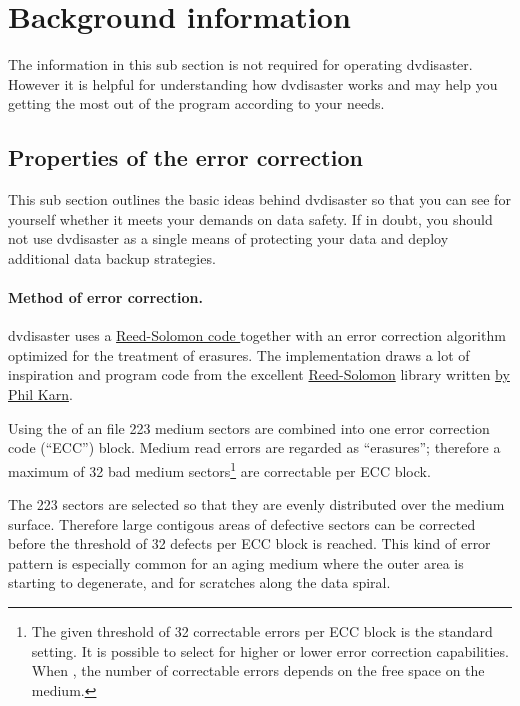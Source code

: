 \section{Background information}
\label{background}

The information in this sub section is not required for operating 
dvdisaster. However it is helpful for understanding how dvdisaster works 
and may help you getting the most out of the program according to your needs. 

\subsection{Properties of the error correction}
\label{background-properties}

This sub section outlines the basic ideas behind dvdisaster so that you can 
see for yourself whether it meets your demands on data safety. If in doubt, 
you should not use dvdisaster as a single means of protecting your data
and deploy additional data backup strategies.

\paragraph{Method of error correction.}   dvdisaster 
uses a \href{http://en.wikipedia.org/wiki/Reed-Solomon_error_correction}{Reed-Solomon code } together 
with an error correction algorithm optimized for the treatment of erasures. The 
implementation draws a lot of inspiration and program code from the 
excellent \href{http://www.ka9q.net/code/fec/}{Reed-Solomon} library written 
\href{http://www.ka9q.net/}{by Phil Karn}.

Using the  of 
an  file 223 medium sectors 
are combined into one error correction code (``ECC'') block. 
Medium read errors are regarded as ``erasures''; therefore a maximum 
of 32 bad medium sectors\footnote{The given threshold of 32 correctable errors per ECC 
block is the standard setting. It is possible to select  
for higher or lower error correction capabilities. 
When , 
the number of correctable errors depends on the free space on the medium.} are 
correctable per ECC block.

The 223 sectors are selected so that they are evenly distributed over the medium 
surface. Therefore large contigous areas of defective sectors can be corrected before 
the threshold of 32 defects per ECC block is reached. This kind of error 
pattern is especially common for an aging medium where the outer area is starting 
to degenerate, and for scratches along the data spiral.

